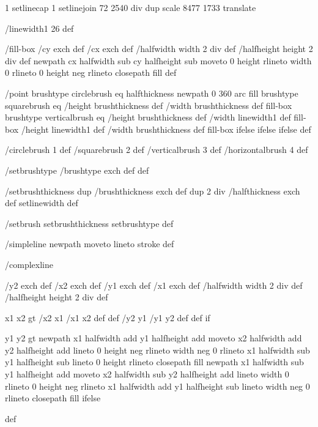 1 setlinecap 1 setlinejoin
72 2540 div dup scale
8477 1733 translate



/linewidth1 26 def

/fill-box
  { /cy exch def /cx exch def
    /halfwidth width 2 div def
    /halfheight height 2 div def
    newpath
     cx halfwidth sub cy halfheight sub moveto
     0 height rlineto
     width 0 rlineto
     0 height neg rlineto
     closepath
     fill } def

/point
  { brushtype circlebrush eq
     { halfthickness newpath 0 360 arc fill }
     { brushtype squarebrush eq
        { /height brushthickness def
	  /width brushthickness def
	  fill-box }
        { brushtype verticalbrush eq
           { /height brushthickness def
	     /width linewidth1 def
	     fill-box }
           { /height linewidth1 def
	     /width brushthickness def
	     fill-box }
	   ifelse }
        ifelse }
     ifelse } def

/circlebrush     1 def
/squarebrush     2 def
/verticalbrush   3 def
/horizontalbrush 4 def

/setbrushtype { /brushtype exch def } def

/setbrushthickness
  { dup /brushthickness exch def
    dup 2 div /halfthickness exch def
    setlinewidth } def

/setbrush { setbrushthickness setbrushtype } def

/simpleline { newpath moveto lineto stroke } def

/complexline
  { /y2 exch def /x2 exch def
    /y1 exch def /x1 exch def
    /halfwidth width 2 div def
    /halfheight height 2 div def

    x1 x2 gt { /x2 x1 /x1 x2 def def /y2 y1 /y1 y2 def def } if

    y1 y2 gt
     { %
       newpath
        x1 halfwidth add y1 halfheight add moveto
	x2 halfwidth add y2 halfheight add lineto
	0 height neg rlineto
        width neg 0 rlineto
        x1 halfwidth sub y1 halfheight sub lineto
        0 height rlineto
        closepath
	fill }
     { %
       newpath
        x1 halfwidth sub y1 halfheight add moveto
	x2 halfwidth sub y2 halfheight add lineto
	width 0 rlineto
	0 height neg rlineto
	x1 halfwidth add y1 halfheight sub lineto
	width neg 0 rlineto
	closepath
	fill }
     ifelse } def

